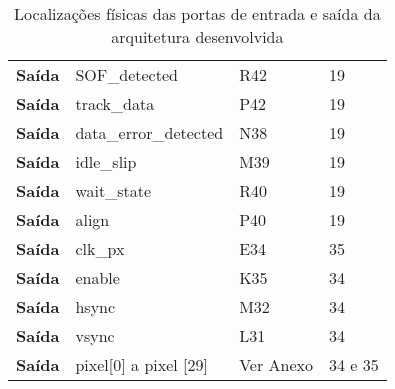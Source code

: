 \begin{table}[h!]
\begin{tabular}{rlll}
			\multicolumn{1}{r|}{\textbf{Saída}}   & SOF\_detected                      & R42                                      & 19                                         \\
			\multicolumn{1}{r|}{\textbf{Saída}}   & track\_data                        & P42                                      & 19                                         \\
			\multicolumn{1}{r|}{\textbf{Saída}}   & data\_error\_detected              & N38                                      & 19                                         \\
			\multicolumn{1}{r|}{\textbf{Saída}}   & idle\_slip                         & M39                                      & 19                                         \\
			\multicolumn{1}{r|}{\textbf{Saída}}   & wait\_state                        & R40                                      & 19                                         \\
			\multicolumn{1}{r|}{\textbf{Saída}}   & align                              & P40                                      & 19                                         \\
			\multicolumn{1}{r|}{\textbf{Saída}}   & clk\_px                            & E34                                      & 35                                         \\
			\multicolumn{1}{r|}{\textbf{Saída}}   & enable                             & K35                                      & 34                                         \\
			\multicolumn{1}{r|}{\textbf{Saída}}   & hsync                              & M32                                      & 34                                         \\
			\multicolumn{1}{r|}{\textbf{Saída}}   & vsync                              & L31                                      & 34                                         \\
			\multicolumn{1}{r|}{\textbf{Saída}}   & pixel{[}0{]} a pixel {[}29{]}      & Ver Anexo                                & 34 e 35                                    \\ \hline
		\end{tabular}%
	\caption[Localizações físicas das portas de entrada e saída da arquitetura desenvolvida]{Localizações físicas das portas de entrada e saída da arquitetura desenvolvida}
	\label{table:loc_planD_simples}
\end{table}


